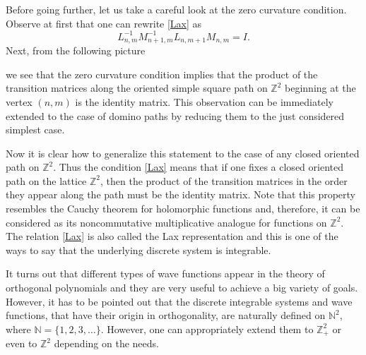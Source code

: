 \documentclass{amsart}
\theoremstyle{remark}
\numberwithin{equation}{section}
\begin{document}
Before going further, let us take a careful look at the zero curvature condition. Observe at first that
one can rewrite \eqref{Lax} as
\[
L_{n,m}^{-1}M_{n+1,m}^{-1}L_{n,m+1}M_{n,m}=I.
\]
Next, from the following picture
\begin{center}
\end{center}
we see that the zero curvature condition implies that the product of the transition matrices along
the oriented simple square path on ${{\mathbb Z}}^2$ beginning at the vertex $(n,m)$ is the identity matrix.
This observation can be immediately extended to the case of domino paths by reducing them to the just considered simplest case.
\begin{center}
\end{center}
Now it is clear how to generalize this statement to the case of any closed oriented path on ${{\mathbb Z}}^2$.
Thus the condition \eqref{Lax} means that if one fixes a closed oriented path on the lattice ${{\mathbb Z}}^2$, then
the product of the transition matrices in the order they appear along the path must be the identity matrix.
Note that this property resembles the Cauchy theorem for holomorphic functions and, therefore, it can be considered
as its noncommutative multiplicative analogue for functions on ${{\mathbb Z}}^2$.
The relation \eqref{Lax} is also called the Lax representation and this is one of the ways to say that the underlying
discrete system is integrable.

It turns out that different types of wave functions appear in the theory of orthogonal polynomials and they  are very useful to achieve a big variety of goals. However, it has to be pointed out that the discrete integrable systems and wave functions, that have their origin in orthogonality, are naturally defined on ${{\mathbb N}}^2$, where ${{\mathbb N}}=\{1,2,3, \dots\}$.
However, one can appropriately extend them to ${{\mathbb Z}}_+^2$ or even to ${{\mathbb Z}}^2$ depending on the needs.
\end{document}
